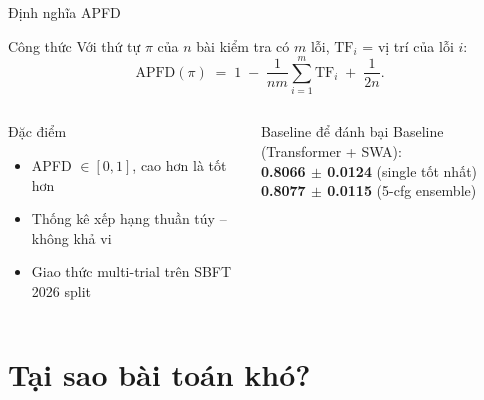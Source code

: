 \documentclass[aspectratio=169,10pt]{beamer}
\begin{document}
\begin{frame}{Định nghĩa APFD}
\begin{block}{Công thức}
\scriptsize
Với thứ tự $\pi$ của $n$ bài kiểm tra có $m$ lỗi, $\mathrm{TF}_i$ = vị trí của lỗi $i$:
\[
  \mathrm{APFD}(\pi) \;=\; 1 \;-\; \frac{1}{nm}\sum_{i=1}^{m} \mathrm{TF}_i \;+\; \frac{1}{2n}.
\]
\end{block}

\begin{columns}[T]
\begin{block}{Đặc điểm}
\scriptsize
\begin{itemize}
  \item APFD $\in [0, 1]$, cao hơn là tốt hơn
  \item Thống kê xếp hạng thuần túy -- không khả vi
  \item Giao thức multi-trial trên SBFT 2026 split
\end{itemize}
\end{block}

\begin{block}{Baseline để đánh bại}
\scriptsize
Baseline (Transformer + SWA): \\
\quad \textbf{0.8066 $\pm$ 0.0124} (single tốt nhất)\\
\quad \textbf{0.8077 $\pm$ 0.0115} (5-cfg ensemble)
\end{block}
\end{columns}
\end{frame}

\section{Tại sao bài toán khó?}
\end{document}
